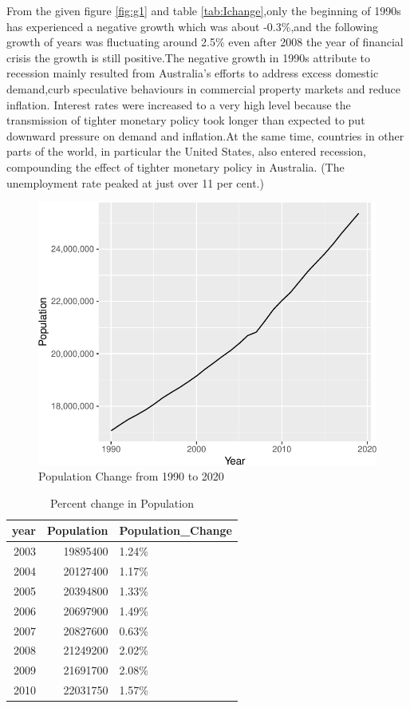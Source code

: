 \documentclass[11pt,a4paper,]{article}
\begin{document}
From the given figure \ref{fig:g1} and table \ref{tab:Ichange},only the beginning of 1990s has experienced a negative growth which was about -0.3\%,and the following growth of years was fluctuating around 2.5\% even after 2008 the year of financial crisis the growth is still positive.The negative growth in 1990s attribute to recession mainly resulted from Australia's efforts to address excess domestic demand,curb speculative behaviours in commercial property markets and reduce inflation. Interest rates were increased to a very high level because the transmission of tighter monetary policy took longer than expected to put downward pressure on demand and inflation.At the same time, countries in other parts of the world, in particular the United States, also entered recession, compounding the effect of tighter monetary policy in Australia. (The unemployment rate peaked at just over 11 per cent.)

\begin{figure}[H]

{\centering \includegraphics{Figures/g2-1} 

}

\caption{Population Change from 1990 to 2020}\label{fig:g2}
\end{figure}

\begin{table}[H]

\caption{\label{tab:Tchange}Percent change in Population}
\centering
\begin{tabular}[t]{r|r|l}
\hline
year & Population & Population\_Change\\
\hline
2003 & 19895400 & 1.24\%\\
\hline
2004 & 20127400 & 1.17\%\\
\hline
2005 & 20394800 & 1.33\%\\
\hline
2006 & 20697900 & 1.49\%\\
\hline
2007 & 20827600 & 0.63\%\\
\hline
2008 & 21249200 & 2.02\%\\
\hline
2009 & 21691700 & 2.08\%\\
\hline
2010 & 22031750 & 1.57\%\\
\hline
\end{tabular}
\end{table}
\end{document}
